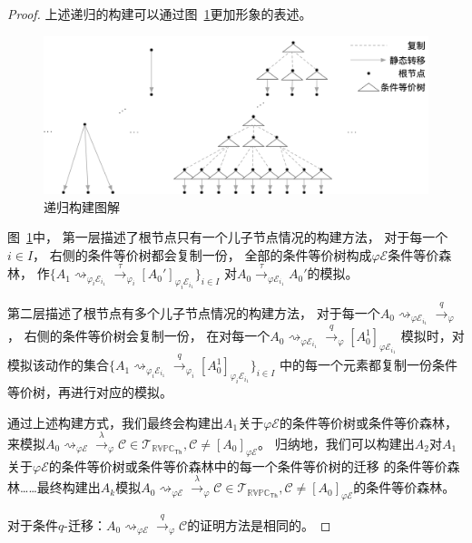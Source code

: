 \begin{proof}
   上述递归的构建可以通过图~\ref{fig:equal_forest}更加形象的表述。
   \begin{figure}[!htbp]
      \small
      \centering
      \includegraphics[width=13cm]{../figures/equality_1.png}
      \caption[]{递归构建图解} 
      \label{fig:equal_forest}
   \end{figure}
   图~\ref{fig:equal_forest}中，
   第一层描述了根节点只有一个儿子节点情况的构建方法，
   对于每一个$i\in I$，
   右侧的条件等价树都会复制一份，
   全部的条件等价树构成$\varphi\mathcal{E}$条件等价森林，
   作$\{A_1\rightsquigarrow_{\varphi_i\mathcal{E}_{i_1}}\stackrel{\tau}{\rightarrow}_{\varphi_i}[A_0']_{\varphi_i\mathcal{E}_{i_1}}\}_{i\in I}$
   对$A_0\stackrel{\tau}{\rightarrow}_{\varphi\mathcal{E}_{i_1}}A_0'$的模拟。

   第二层描述了根节点有多个儿子节点情况的构建方法，
   对于每一个$A_0\rightsquigarrow_{\varphi\mathcal{E}_{i_1}}\stackrel{q}{\rightarrow}_{\varphi}$，
   右侧的条件等价树会复制一份，
   在对每一个$A_0\rightsquigarrow_{\varphi\mathcal{E}_{i_1}}\stackrel{q}{\rightarrow}_{\varphi} [A_0^1]_{\varphi\mathcal{E}_{i_1}}$
   模拟时，对模拟该动作的集合$\{A_1\rightsquigarrow_{\varphi_i\mathcal{E}_{i_1}}\stackrel{q}{\rightarrow}_{\varphi_i} [A_0^1]_{\varphi_i\mathcal{E}_{i_1}}\}_{i\in I}$
   中的每一个元素都复制一份条件等价树，再进行对应的模拟。

   通过上述构建方式，我们最终会构建出$A_1$关于$\varphi\mathcal{E}$的条件等价树或条件等价森林，
   来模拟$A_0\rightsquigarrow_{\varphi\mathcal{E}}\stackrel{\lambda}{\rightarrow}_{\varphi} \mathcal{C}\in \mathcal{T}_{\mathbb{RVPC}_{\mathsf{Th}}},\mathcal{C}\neq [A_0]_{\varphi\mathcal{E}}$。
   归纳地，我们可以构建出$A_2$对$A_1$关于$\varphi\mathcal{E}$的条件等价树或条件等价森林中的每一个条件等价树的迁移
   的条件等价森林……最终构建出$A_k$模拟$A_0\rightsquigarrow_{\varphi\mathcal{E}}\stackrel{\lambda}{\rightarrow}_{\varphi} \mathcal{C}\in \mathcal{T}_{\mathbb{RVPC}_{\mathsf{Th}}},\mathcal{C}\neq [A_0]_{\varphi\mathcal{E}}$的条件等价森林。

   对于条件$q$-迁移：$A_0\rightsquigarrow_{\varphi\mathcal{E}}\stackrel{q}{\rightarrow}_{\varphi}\mathcal{C}$的证明方法是相同的。
\end{proof}


